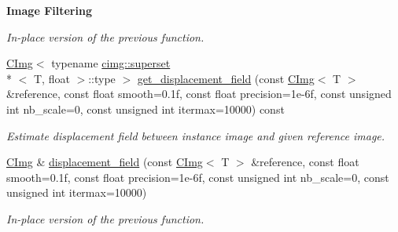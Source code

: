 \begin{Indent}{\bf Image Filtering}
\begin{DoxyCompactItemize}
\begin{DoxyCompactList}\small\item\em In-\/place version of the previous function. \end{DoxyCompactList}\item 
\hypertarget{structcimg__library_1_1_c_img_a893d2fb4605e9033d1824d7de429a656}{\hyperlink{structcimg__library_1_1_c_img}{C\-Img}$<$ typename \hyperlink{structcimg__library_1_1cimg_1_1superset}{cimg\-::superset}\\*
$<$ T, float $>$\-::type $>$ \hyperlink{structcimg__library_1_1_c_img_a893d2fb4605e9033d1824d7de429a656}{get\-\_\-displacement\-\_\-field} (const \hyperlink{structcimg__library_1_1_c_img}{C\-Img}$<$ T $>$ \&reference, const float smooth=0.\-1f, const float precision=1e-\/6f, const unsigned int nb\-\_\-scale=0, const unsigned int itermax=10000) const }\label{structcimg__library_1_1_c_img_a893d2fb4605e9033d1824d7de429a656}

\begin{DoxyCompactList}\small\item\em Estimate displacement field between instance image and given reference image. \end{DoxyCompactList}\item 
\hypertarget{structcimg__library_1_1_c_img_a3e393fd1f7b42451f4bb1ade1bcabddc}{\hyperlink{structcimg__library_1_1_c_img}{C\-Img} \& \hyperlink{structcimg__library_1_1_c_img_a3e393fd1f7b42451f4bb1ade1bcabddc}{displacement\-\_\-field} (const \hyperlink{structcimg__library_1_1_c_img}{C\-Img}$<$ T $>$ \&reference, const float smooth=0.\-1f, const float precision=1e-\/6f, const unsigned int nb\-\_\-scale=0, const unsigned int itermax=10000)}\label{structcimg__library_1_1_c_img_a3e393fd1f7b42451f4bb1ade1bcabddc}

\begin{DoxyCompactList}\small\item\em In-\/place version of the previous function. \end{DoxyCompactList}\end{DoxyCompactItemize}
\end{Indent}
